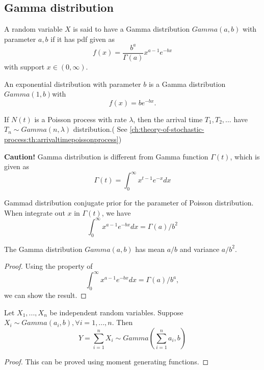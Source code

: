 \begin{refsection}
\subsection{Gamma distribution}
\begin{definition}\cite[42]{murphy2012machine}
A random variable $X$ is said to have a Gamma distribution $Gamma(a,b)$ with parameter $a,b$ if it has pdf given as
$$f(x) = \frac{b^a}{\Gamma(a)}x^{a-1}e^{-bx}$$
with support $x\in (0,\infty)$.	
\end{definition}

\begin{remark}
An exponential distribution with parameter $b$ is a Gamma distribution $Gamma(1,b)$with 
$$f(x) = be^{-bx}.$$
\end{remark}

\begin{remark}
If $N(t)$ is a Poisson process with rate $\lambda$, then the arrival time $T_1,T_2,...$ have $T_n\sim Gamma(n,\lambda)$ distribution.( See
	\autoref{ch:theory-of-stochastic-process:th:arrivaltimepoissonprocess})
\end{remark}

\begin{mdframed}
\textbf{Caution!}
Gamma distribution is different from Gamma function $\Gamma(t)$, which is given as
$$\Gamma(t) = \int_0^\infty x^{t-1}e^{-x}dx$$
\end{mdframed}

\begin{remark}
	Gammad distribution conjugate prior for the parameter of Poisson distribution. When integrate out $x$ in $\Gamma(t)$, we have
	$$ \int_0^\infty  x^{a-1}e^{-bx} dx = \Gamma(a)/b^2$$
\end{remark}

\begin{lemma}
The Gamma distribution $Gamma(a,b)$ has mean $a/b$ and variance $a/b^2$.
\end{lemma}
\begin{proof}
Using the property of$$ \int_0^\infty  x^{a-1}e^{-bx} dx = \Gamma(a)/b^a,$$
we can show the result. 
\end{proof}


\begin{theorem}\cite[163]{hoggintroduction}\label{ch:theory-of-statistics:th:sumofGamma}
Let $X_1,...,X_n$ be independent random variables. Suppose $X_i \sim Gamma(a_i,b),\forall i=1,...,n$. Then
$$Y = \sum_{i=1}^n X_i \sim Gamma(\sum_{i=1}^n a_i,b)$$
\end{theorem}
\begin{proof}
This can be proved using moment generating functions.
\end{proof}


\end{refsection}

